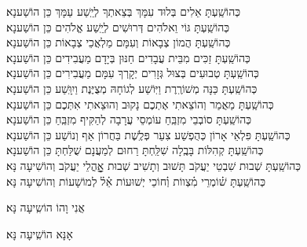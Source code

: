 \documentclass[twoside, openany, parskip=half, 11pt]{book}
\begin{document}
\begin{small}
כְּהוֹשַֽׁעְתָּ אֵלִים בְּלוּד עִמָּךְ בְּצֵאתְךָ לְיֵֽשַׁע עַמָּךְ \hfill כֵּן הוֹשַׁענָא׃ \\
כְּהוֹשַֽׁעְתָּ גּוֹי וֵאלֹהִים דְּרוּשִׁים לְיֵֽשַׁע אֱלֹהִים \hfill כֵּן הוֹשַׁענָא׃ \\
כְּהוֹשַֽׁעְתָּ הֲמוֹן צְבָאוֹת וְעִמָּם מַלְאֲכֵי צְבָאוֹת \hfill כֵּן הוֹשַׁענָא׃ \\
כְּהוֹשַֽׁעְתָּ זַכִּים מִבֵּית עֲבָדִים חַנּוּן בְּיָדָם מַעֲבִידִים \hfill כֵּן הוֹשַׁענָא׃ \\
כְּהוֹשַֽׁעְתָּ טְבוּעִים בְּצוּל גְּזָרִים יְקָרְךָ עִמָּם מַעֲבִירִים \hfill כֵּן הוֹשַׁענָא׃ \\
כְּהוֹשַֽׁעְתָּ כַּנָּה מְשׁוֹרֶֽרֶת וַיּֽוֹשַׁע לְגוֹחָהּ מְצֻיֶּנֶת וַיִוָּֽשַׁע \hfill כֵּן הוֹשַׁענָא׃ \\
כְּהוֹשַֽׁעְתָּ מַאֲמַר וְהוֹצֵאתִי אֶתְכֶם נָקוּב וְהוּצֵאתִי אִתְּכֶם \hfill כֵּן הוֹשַׁענָא׃\\
כְּהוֹשַֽׁעְתָּ סוֹבְבֵי מִזְבֵּֽחַ עוֹמְסֵי עֲרָבָה לְהַקִּיף מִזְבֵּֽחַ \hfill כֵּן הוֹשַׁענָא׃ \\
כְּהוֹשַֽׁעְתָּ פִּלְאֵי אָרוֹן כְּהֻפְשַׁע צִעֵר פְּלֶֽשֶׁת בַּחֲרוֹן אַף וְנוֹשַׁע \hfill כֵּן הוֹשַׁענָא׃ \\
כְּהוֹשַֽׁעְתָּ קְהִלּוֹת בָּבֶֽלָה שִׁלַּֽחְתָּ רַחוּם לְמַעֲנָם שֻׁלַּחְתָּ \hfill כֵּן הוֹשַׁענָא׃\\
כְּהוֹשַֽׁעְתָּ שְׁבוּת שִׁבְטֵי יַעֲקֹב תָּשׁוּב וְתָשִׁיב שְׁבוּת אׇׇׇׇׇהֳלֵי יַעֲקֹב \hfill וְהוֹשִׁיעָה נָּא׃\\
כְּהוֹשַֽׁעְתָּ שׁ֗וֹמְרֵי מִ֗צְווֹת וְ֗חוֹכֵי יְשׁוּעוֹת אֵ֗ל֗ לְמוֹשָׁעוֹת \hfill וְהוֹשִׁיעָה נָּא׃

\end{small}

\begin{large}
\shatz
אֲנִי וָהוֹ הוֹשִֽיעָה נָּא׃

\shatzvkahal
אָנָּא הוֹשִֽׁיעָה נָּא׃

\end{large}
\end{document}

